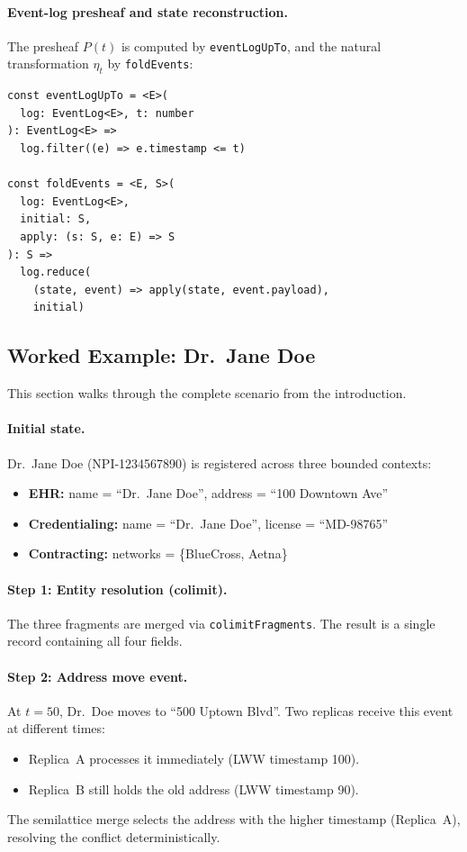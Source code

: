 \documentclass[11pt,a4paper]{article}
\begin{document}
\paragraph{Event-log presheaf and state reconstruction.}
The presheaf $P(t)$ is computed by \texttt{eventLogUpTo}, and the
natural transformation $\eta_t$ by \texttt{foldEvents}:

\begin{lstlisting}[caption={Presheaf and state reconstruction.}]
const eventLogUpTo = <E>(
  log: EventLog<E>, t: number
): EventLog<E> =>
  log.filter((e) => e.timestamp <= t)

const foldEvents = <E, S>(
  log: EventLog<E>,
  initial: S,
  apply: (s: S, e: E) => S
): S =>
  log.reduce(
    (state, event) => apply(state, event.payload),
    initial)
\end{lstlisting}

\subsection{Worked Example: Dr.~Jane Doe}
\label{sec:worked-example}

This section walks through the complete scenario from the introduction.

\paragraph{Initial state.}
Dr.~Jane Doe (NPI-1234567890) is registered across three bounded
contexts:
\begin{itemize}
  \item \textbf{EHR:} name = ``Dr.~Jane Doe'', address = ``100 Downtown Ave''
  \item \textbf{Credentialing:} name = ``Dr.~Jane Doe'', license = ``MD-98765''
  \item \textbf{Contracting:} networks = \{BlueCross, Aetna\}
\end{itemize}

\paragraph{Step 1: Entity resolution (colimit).}
The three fragments are merged via \texttt{colimitFragments}.
The result is a single record containing all four fields.

\paragraph{Step 2: Address move event.}
At $t\!=\!50$, Dr.~Doe moves to ``500 Uptown Blvd''. Two replicas
receive this event at different times:
\begin{itemize}
  \item Replica~A processes it immediately (LWW timestamp 100).
  \item Replica~B still holds the old address (LWW timestamp 90).
\end{itemize}
The semilattice merge selects the address with the higher timestamp
(Replica~A), resolving the conflict deterministically.
\end{document}
